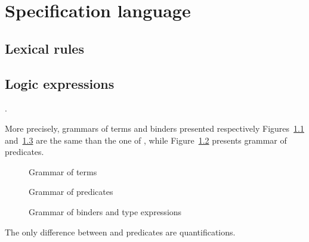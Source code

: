 
\chapter{Specification language}
\label{chap:base}


\section{Lexical rules}

\nodiff


\section{Logic expressions}
\label{sec:expressions}

.

More precisely, grammars of terms and binders presented respectively
Figures~\ref{fig:gram:term} and~\ref{fig:gram:binders} are the same than the one
of \acsl, while Figure~\ref{fig:gram:pred} presents grammar of predicates.
\begin{figure}[htbp]
  \begin{cadre}
    
  \end{cadre}
  \caption{Grammar of terms}
\label{fig:gram:term}
\end{figure}
\begin{figure}[htbp]
  \begin{cadre}
    
  \end{cadre}
  \caption{Grammar of predicates}
\label{fig:gram:pred}
\end{figure}
\begin{figure}[htbp]
  \caption{Grammar of binders and type expressions}
\label{fig:gram:binders}
\end{figure}
The only difference between \eacsl and \acsl predicates are
quantifications.

